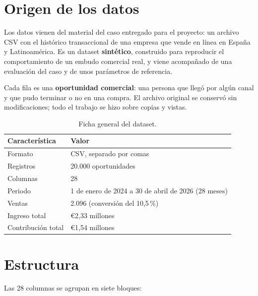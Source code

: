\documentclass[11pt,letterpaper]{article}
\newcommand{\encabezado}{\rowcolor{mcicCian!15}}
\begin{document}
\UDportada

\section{Origen de los datos}

Los datos vienen del material del caso entregado para el proyecto: un archivo CSV con el histórico
transaccional de una empresa que vende en línea en España y Latinoamérica. Es un dataset \textbf{sintético},
construido para reproducir el comportamiento de un embudo comercial real, y viene acompañado de una evaluación
del caso y de unos parámetros de referencia.

Cada fila es una \textbf{oportunidad comercial}: una persona que llegó por algún canal y que pudo terminar o no
en una compra. El archivo original se conservó sin modificaciones; todo el trabajo se hizo sobre copias y vistas.

\begin{table}[H]
\centering
\caption{Ficha general del dataset.}
\begin{tabular}{ll}
\toprule
\encabezado Característica & Valor \\
\midrule
Formato & CSV, separado por comas \\
Registros & 20.000 oportunidades \\
Columnas & 28 \\
Periodo & 1 de enero de 2024 a 30 de abril de 2026 (28 meses) \\
Ventas & 2.096 (conversión del 10,5\,\%) \\
Ingreso total & €2,33 millones \\
Contribución total & €1,54 millones \\
\bottomrule
\end{tabular}
\end{table}

\section{Estructura}

Las 28 columnas se agrupan en siete bloques:
\end{document}
